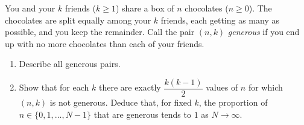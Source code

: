 You and your $k$ friends ($k\ge1$) share a box of $n$ chocolates ($n\ge0$). The chocolates are split equally among your $k$ friends, each getting as many as possible, and you keep the remainder. Call the pair $(n,k)$ \emph{generous} if you end up with no more chocolates than each of your friends.
\begin{enumerate}
\item[(a)] Describe all generous pairs.
\item[(b)] Show that for each $k$ there are exactly $\dfrac{k(k-1)}2$ values of $n$ for which $(n,k)$ is not generous. Deduce that, for fixed $k$, the proportion of $n\in\{0,1,\dots,N-1\}$ that are generous tends to $1$ as $N\to\infty$.
\end{enumerate}
